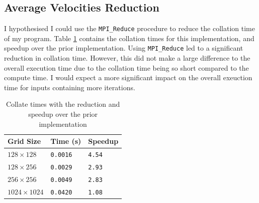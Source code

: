 \documentclass[twocolumn, a4paper]{article}
\begin{document}


\subsection{Average Velocities Reduction}

I hypothesised I could use the \texttt{MPI\_Reduce} procedure to reduce the collation time of my program.
Table \ref{tab:reduction} contains the collation times for this implementation, and speedup over the prior implementation.
Using \texttt{MPI\_Reduce} led to a significant reduction in collation time.
However, this did not make a large difference to the overall execution time due to the collation time being so short compared to the compute time.
I would expect a more significant impact on the overall exeuction time for inputs containing more iterations.

\begin{table}[htbp]
  \begin{center}
  \caption{Collate times with the reduction and speedup over the prior implementation}\label{tab:reduction}
  \begin{tabular}[t]{l | l l} 
      \hline\hline
      Grid Size&Time (s)&Speedup\\
      \hline
      $128 \times 128$&\texttt{0.0016}&\texttt{4.54}\\
      $128 \times 256$&\texttt{0.0029}&\texttt{2.93}\\
      $256 \times 256$&\texttt{0.0049}&\texttt{2.83}\\
      $1024 \times 1024$&\texttt{0.0420}&\texttt{1.08}\\
      \hline
    \end{tabular}
  \end{center}
\end{table}
\end{document}
